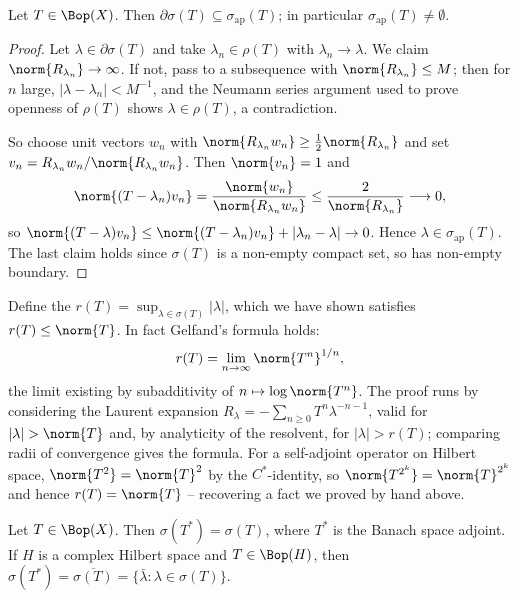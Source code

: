 \begin{proposition}
	Let $T \in \Bop(X)$. Then $\partial\sigma(T)\subseteq\sigma_{\mathrm{ap}}(T)$; in particular $\sigma_{\mathrm{ap}}(T)\neq\emptyset$.
\end{proposition}

\begin{proof}
	Let $\lambda\in\partial\sigma(T)$ and take $\lambda_n \in\rho(T)$ with $\lambda_n\to\lambda$. We claim $\norm{R_{\lambda_n}}\to\infty$. If not, pass to a subsequence with $\norm{R_{\lambda_n}}\leq M$; then for $n$ large, $|\lambda-\lambda_n|<M^{-1}$, and the Neumann series argument used to prove openness of $\rho(T)$ shows $\lambda\in\rho(T)$, a contradiction.

	So choose unit vectors $w_n$ with $\norm{R_{\lambda_n}w_n}\geq\frac12\norm{R_{\lambda_n}}$ and set $v_n = R_{\lambda_n}w_n/\norm{R_{\lambda_n}w_n}$. Then $\norm{v_n}=1$ and
	$$\norm{(T-\lambda_n)v_n} = \frac{\norm{w_n}}{\norm{R_{\lambda_n}w_n}}\leq\frac{2}{\norm{R_{\lambda_n}}}\longrightarrow0,$$
	so $\norm{(T-\lambda)v_n}\leq\norm{(T-\lambda_n)v_n}+|\lambda_n-\lambda|\to0$. Hence $\lambda\in\sigma_{\mathrm{ap}}(T)$. The last claim holds since $\sigma(T)$ is a non-empty compact set, so has non-empty boundary.
\end{proof}

\begin{remark}
	Define the  $r(T) = \sup_{\lambda\in\sigma(T)}|\lambda|$, which we have shown satisfies $r(T)\leq\norm{T}$. In fact Gelfand's formula holds:
	$$r(T) = \lim_{n\to\infty}\norm{T^n}^{1/n},$$
	the limit existing by subadditivity of $n \mapsto \log\norm{T^n}$. The proof runs by considering the Laurent expansion $R_\lambda = -\sum_{n\geq0}T^n\lambda^{-n-1}$, valid for $|\lambda|>\norm{T}$ and, by analyticity of the resolvent, for $|\lambda|>r(T)$; comparing radii of convergence gives the formula. For a self-adjoint operator on Hilbert space, $\norm{T^2}=\norm{T}^2$ by the $C^*$-identity, so $\norm{T^{2^k}}=\norm{T}^{2^k}$ and hence $r(T)=\norm{T}$ -- recovering a fact we proved by hand above.
\end{remark}

\begin{proposition}
	Let $T\in\Bop(X)$. Then $\sigma(T^*) = \sigma(T)$, where $T^*$ is the Banach space adjoint. If $H$ is a complex Hilbert space and $T\in\Bop(H)$, then $\sigma(T^*) = \overline{\sigma(T)}=\{\bar\lambda : \lambda\in\sigma(T)\}$.
\end{proposition}

